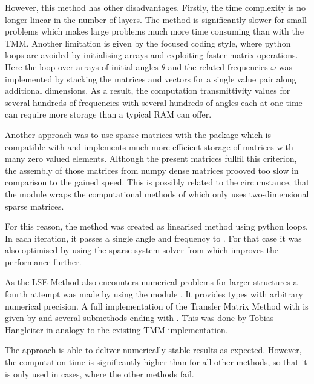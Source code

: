 However, this method has other disadvantages. Firstly, the time complexity is
no longer linear in the number of layers. %
The method is significantly slower for small problems which makes large
problems much more time consuming than with the TMM.
Another limitation is given by
the  focused coding style, where python loops are avoided by
initialising arrays and exploiting faster matrix operations. Here the loop over
arrays of initial angles $\theta$ and the related frequencies $\omega$ was
implemented by stacking the matrices and vectors for a single value pair along
additional dimensions. As a result, the computation transmittivity values for
several hundreds of frequencies with several hundreds of angles each at one
time can require more storage than a typical RAM can offer.

Another approach was to use sparse matrices
with the package  which is compatible with  and
implements much more efficient storage of matrices with many zero valued
elements. Although the present matrices fullfil this criterion, the assembly of
those matrices from numpy dense matrices prooved too slow in comparison to the
gained speed. This is possibly related to the circumstance, that the module
wraps the computational methods of  which only uses
two-dimensional sparse matrices.

For this reason, the method  was created as linearised
method using python loops. In each iteration, it passes a single angle and
frequency to . For that case it was also optimised by using
the sparse system solver  from  which
improves the performance further.

As the LSE Method also encounters numerical problems for larger structures a
fourth attempt was made by using the module . It provides
types with arbitrary numerical precision. A full implementation of the Transfer
Matrix Method with  is given by  and
several submethods ending with . This was done by Tobias Hangleiter in
analogy to the existing TMM implementation.

The  approach is able to deliver numerically stable results as expected.
However, the computation time is significantly higher than for all other methods, 
so that it is only used in cases, where the other methods fail.


